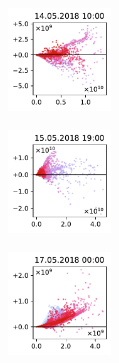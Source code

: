 \begin{figure}[H]
    \centering
    \begin{subfigure}
        \centering
        \includegraphics[width=0.30\textwidth,valign=t]{evaluation/figures/perturbations/perturbation-14.05.2018:10.00-nox-mul-1.5.pdf}
    \end{subfigure}
    \begin{subfigure}
        \centering
        \includegraphics[width=0.30\textwidth,valign=t]{evaluation/figures/perturbations/perturbation-15.05.2018:19.00-nox-mul-1.5.pdf}
    \end{subfigure}
    \begin{subfigure}
        \centering
        \includegraphics[width=0.30\textwidth,valign=t]{evaluation/figures/perturbations/perturbation-17.05.2018:00.00-nox-mul-1.5.pdf}
    \end{subfigure}


\end{figure}
